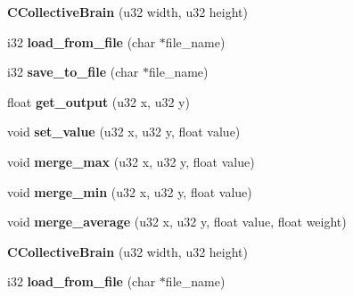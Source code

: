 \begin{DoxyCompactItemize}
\item 
\hypertarget{classCCollectiveBrain_a7c6dd4860455a539d8107cb4e6cde0a8}{{\bfseries C\-Collective\-Brain} (u32 width, u32 height)}\label{classCCollectiveBrain_a7c6dd4860455a539d8107cb4e6cde0a8}

\item 
\hypertarget{classCCollectiveBrain_a8767e026138fee50709281f11bfb9fcb}{i32 {\bfseries load\-\_\-from\-\_\-file} (char $\ast$file\-\_\-name)}\label{classCCollectiveBrain_a8767e026138fee50709281f11bfb9fcb}

\item 
\hypertarget{classCCollectiveBrain_ad73e195c1ae9a7e4a27da1809d8bd976}{i32 {\bfseries save\-\_\-to\-\_\-file} (char $\ast$file\-\_\-name)}\label{classCCollectiveBrain_ad73e195c1ae9a7e4a27da1809d8bd976}

\item 
\hypertarget{classCCollectiveBrain_aa4ac7fb568f2b32d3447de85ed4e3ffc}{float {\bfseries get\-\_\-output} (u32 x, u32 y)}\label{classCCollectiveBrain_aa4ac7fb568f2b32d3447de85ed4e3ffc}

\item 
\hypertarget{classCCollectiveBrain_a5336b7b533338ae3cb26a8acea9745b4}{void {\bfseries set\-\_\-value} (u32 x, u32 y, float value)}\label{classCCollectiveBrain_a5336b7b533338ae3cb26a8acea9745b4}

\item 
\hypertarget{classCCollectiveBrain_a8d9856fb8e5e2dc8eaf0e9a069566524}{void {\bfseries merge\-\_\-max} (u32 x, u32 y, float value)}\label{classCCollectiveBrain_a8d9856fb8e5e2dc8eaf0e9a069566524}

\item 
\hypertarget{classCCollectiveBrain_a7e7f9bd67383dd58a62493f8ccc48077}{void {\bfseries merge\-\_\-min} (u32 x, u32 y, float value)}\label{classCCollectiveBrain_a7e7f9bd67383dd58a62493f8ccc48077}

\item 
\hypertarget{classCCollectiveBrain_aa7f35d24b962fd0c400a90bc864328e2}{void {\bfseries merge\-\_\-average} (u32 x, u32 y, float value, float weight)}\label{classCCollectiveBrain_aa7f35d24b962fd0c400a90bc864328e2}

\item 
\hypertarget{classCCollectiveBrain_a7c6dd4860455a539d8107cb4e6cde0a8}{{\bfseries C\-Collective\-Brain} (u32 width, u32 height)}\label{classCCollectiveBrain_a7c6dd4860455a539d8107cb4e6cde0a8}

\item 
\hypertarget{classCCollectiveBrain_a8767e026138fee50709281f11bfb9fcb}{i32 {\bfseries load\-\_\-from\-\_\-file} (char $\ast$file\-\_\-name)}\label{classCCollectiveBrain_a8767e026138fee50709281f11bfb9fcb}


\end{DoxyCompactItemize}
